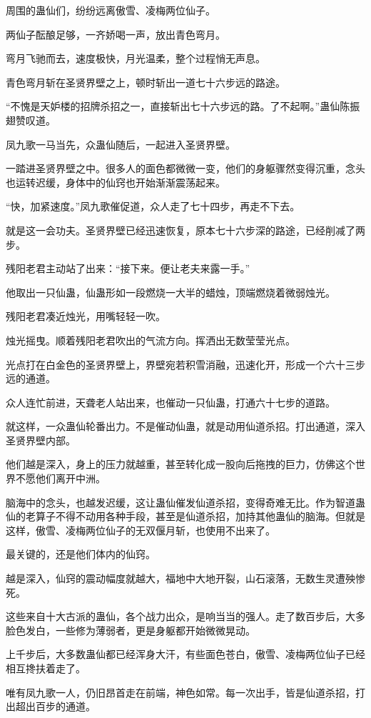 \begin{this_body}
周围的蛊仙们，纷纷远离傲雪、凌梅两位仙子。

两仙子酝酿足够，一齐娇喝一声，放出青色弯月。

弯月飞驰而去，速度极快，月光温柔，整个过程悄无声息。

青色弯月斩在圣贤界壁之上，顿时斩出一道七十六步远的路途。

“不愧是天妒楼的招牌杀招之一，直接斩出七十六步远的路。了不起啊。”蛊仙陈振翅赞叹道。

凤九歌一马当先，众蛊仙随后，一起进入圣贤界壁。

一踏进圣贤界壁之中。很多人的面色都微微一变，他们的身躯骤然变得沉重，念头也运转迟缓，身体中的仙窍也开始渐渐震荡起来。

“快，加紧速度。”凤九歌催促道，众人走了七十四步，再走不下去。

就是这一会功夫。圣贤界壁已经迅速恢复，原本七十六步深的路途，已经削减了两步。

残阳老君主动站了出来：“接下来。便让老夫来露一手。”

他取出一只仙蛊，仙蛊形如一段燃烧一大半的蜡烛，顶端燃烧着微弱烛光。

残阳老君凑近烛光，用嘴轻轻一吹。

烛光摇曳。顺着残阳老君吹出的气流方向。挥洒出无数莹莹光点。

光点打在白金色的圣贤界壁上，界壁宛若积雪消融，迅速化开，形成一个六十三步远的通道。

众人连忙前进，天聋老人站出来，也催动一只仙蛊，打通六十七步的道路。

就这样，一众蛊仙轮番出力。不是催动仙蛊，就是动用仙道杀招。打出通道，深入圣贤界壁内部。

他们越是深入，身上的压力就越重，甚至转化成一股向后拖拽的巨力，仿佛这个世界不愿他们离开中洲。

脑海中的念头，也越发迟缓，这让蛊仙催发仙道杀招，变得奇难无比。作为智道蛊仙的老算子不得不动用各种手段，甚至是仙道杀招，加持其他蛊仙的脑海。但就是这样，傲雪、凌梅两位仙子的无双偃月斩，也使用不出来了。

最关键的，还是他们体内的仙窍。

越是深入，仙窍的震动幅度就越大，福地中大地开裂，山石滚落，无数生灵遭殃惨死。

这些来自十大古派的蛊仙，各个战力出众，是响当当的强人。走了数百步后，大多脸色发白，一些修为薄弱者，更是身躯都开始微微晃动。

上千步后，大多数蛊仙都已经浑身大汗，有些面色苍白，傲雪、凌梅两位仙子已经相互搀扶着走了。

唯有凤九歌一人，仍旧昂首走在前端，神色如常。每一次出手，皆是仙道杀招，打出超出百步的通道。


\end{this_body}

